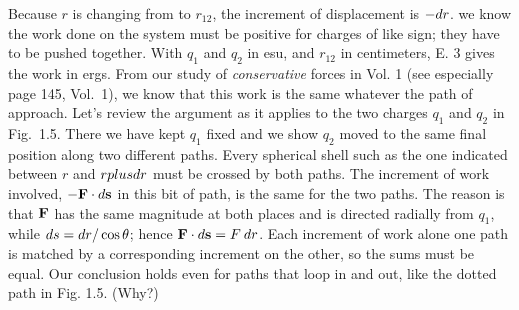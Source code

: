 Because $r$ is changing from  to $r_{12}$, the increment of
displacement is $-d r$. we know the work done on the system must be
positive for charges of like sign; they have to be pushed together.
With $q_1$ and $q_2$ in esu, and $r_{12}$ in centimeters, E. 3 gives
the work in ergs. From our study of \emph{conservative} forces in
Vol. 1 (see especially page 145, Vol.~1), we know that this work is
the same whatever the path of approach. Let's review the argument as
it applies to the two charges $q_1$ and $q_2$ in Fig.~1.5. There we
have kept $q_1$ fixed and we show $q_2$ moved to the same final
position along two different paths. Every spherical shell such as the
one indicated between $r$ and $r plus d r$ must be crossed by both
paths. The increment of work involved, $-\mathbf{F}\cdot d\mathbf{s}$ in this bit of path,
is the same for the two paths. The reason is that $\mathbf{F}$ has the same
magnitude at both places and is directed radially from $q_1$, while
$d s = d r/\cos\theta$; hence $\mathbf{F}\cdot d\mathbf{s} = F\: d r$. Each increment of work
alone one path is matched by a corresponding increment on the other,
so the sums must be equal. Our conclusion
holds even for paths that loop in and out, like the dotted path in
Fig. 1.5. (Why?)

